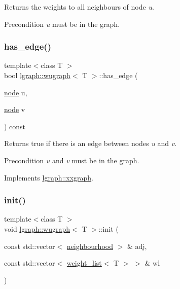 Returns the weights to all neighbours of node {\itshape u}. 

\begin{DoxyPrecond}{Precondition}
{\itshape u} must be in the graph. 
\end{DoxyPrecond}
\mbox{\label{classlgraph_1_1wugraph_a203b19538ef6662a793999973801be93}} 
\subsubsection{\texorpdfstring{has\+\_\+edge()}{has\_edge()}}
{\footnotesize\ttfamily template$<$class T $>$ \\
bool \hyperlink{classlgraph_1_1wugraph}{lgraph\+::wugraph}$<$ T $>$\+::has\+\_\+edge (\begin{DoxyParamCaption}\item[{\hyperlink{namespacelgraph_a397169dd66adf725210a30fb7251773e}{node}}]{u,  }\item[{\hyperlink{namespacelgraph_a397169dd66adf725210a30fb7251773e}{node}}]{v }\end{DoxyParamCaption}) const\hspace{0.3cm}{\ttfamily [virtual]}}



Returns true if there is an edge between nodes {\itshape u} and {\itshape v}. 

\begin{DoxyPrecond}{Precondition}
{\itshape u} and {\itshape v} must be in the graph. 
\end{DoxyPrecond}


Implements \hyperlink{classlgraph_1_1xxgraph_a4e36e9722df020df6ba1dc47b7d9d830}{lgraph\+::xxgraph}.

\mbox{\label{classlgraph_1_1wugraph_adc6e1a1983a2b564349a505e2c8f80c4}} 
\subsubsection{\texorpdfstring{init()}{init()}\hspace{0.1cm}{\footnotesize\ttfamily [1/3]}}
{\footnotesize\ttfamily template$<$class T $>$ \\
void \hyperlink{classlgraph_1_1wugraph}{lgraph\+::wugraph}$<$ T $>$\+::init (\begin{DoxyParamCaption}\item[{const std\+::vector$<$ \hyperlink{namespacelgraph_a052e7766c13f3a43cec0aec8173fdede}{neighbourhood} $>$ \&}]{adj,  }\item[{const std\+::vector$<$ \hyperlink{namespacelgraph_a1e0fd5ef0a78b2a92da48adbed265cb6}{weight\+\_\+list}$<$ T $>$ $>$ \&}]{wl }\end{DoxyParamCaption})}



